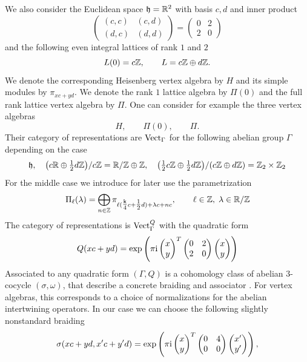 \documentclass[a4paper, reqno]{amsart}
\theoremstyle{introTheorems}
\newcommand{\Vect}{\textup{Vect}}
\newcommand{\y}{\eta}
\renewcommand{\1}{\mathbbold{1}}
\begin{document}
We also consider the Euclidean space $\mathfrak{h}=\mathbb{R}^2$ with basis $c,d$ and inner product 
$$\begin{pmatrix} (c,c) & (c,d) \\ (d,c) & (d,d)\end{pmatrix}=\begin{pmatrix}0 & 2 \\2 & 0\end{pmatrix}$$
and the following even integral lattices of rank $1$ and $2$
\[L(0)=c\mathbb{Z},\qquad L=c\mathbb{Z}\oplus d\mathbb{Z}.\]
We denote the corresponding Heisenberg vertex algebra by $H$ and its simple modules by  $\pi_{xc+yd}$. We denote the rank $1$ lattice algebra by $\Pi(0)$ and the full rank lattice vertex algebra by $\Pi$. One can consider for example the three vertex algebras 
\[
H,\qquad
 \Pi(0),\qquad
 \Pi.
\]
Their category of representations are $\Vect_\Gamma$ for the
following abelian group $\Gamma$ depending on the case
\[\mathfrak{h},\quad
\big(c\mathbb{R}\oplus\tfrac{1}{2}d\mathbb{Z}\big)/c\mathbb{Z}=\mathbb{R}/\mathbb{Z}\oplus \mathbb{Z},\quad
\big(\tfrac{1}{2}c\mathbb{Z}\oplus\tfrac{1}{2}d\mathbb{Z}\big)/
(c\mathbb{Z}\oplus d\mathbb{Z})=\mathbb{Z}_2\times \mathbb{Z}_2
\]
For the middle case we introduce for later use the parametrization 
$$\Pi_\ell(\lambda)=\bigoplus_{n\in\mathbb{Z}}\pi_{\ell(\tfrac{\mathsf{k}}{4}c+\tfrac{1}{2}d)+\lambda c+nc},\qquad \ell\in\mathbb{Z},\;\lambda\in \mathbb{R}/\mathbb{Z}$$
The category of representations is $\Vect_\Gamma^Q$ with the quadratic form \[Q(xc+yd)=\exp\left(\pi\mathrm{i} \begin{pmatrix}
   x\\y  
\end{pmatrix}^T \begin{pmatrix}0 & 2 \\2 & 0\end{pmatrix}
\begin{pmatrix}
   x\\y  
\end{pmatrix} 
\right)
\]
Associated to any quadratic form $(\Gamma,Q)$ is a cohomology  class of abelian $3$-cocycle $(\sigma,\omega)$, that describe a concrete braiding and associator \cites{MacL52,JS93}. For vertex algebras, this corresponds to a choice of normalizations for the abelian intertwining operators. In our case we can choose the following slightly nonstandard braiding \[\sigma(xc+yd,x'c+y'd)=\exp\left(\pi\mathrm{i} \begin{pmatrix}
   x\\y  
\end{pmatrix}^T \begin{pmatrix}0 & 4 \\ 0 & 0\end{pmatrix}
\begin{pmatrix}
   x'\\y'  
\end{pmatrix} 
\right),
\]
\end{document}
